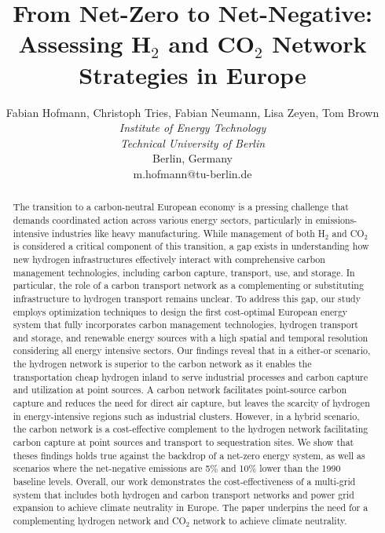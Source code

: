 \documentclass[twocolumn]{article}
\newcommand{\carbon}{CO$_2$}
\newcommand{\hydrogen}{H$_2$}
\begin{document}


\title{From Net-Zero to Net-Negative: Assessing \hydrogen{} and \carbon{} Network Strategies in Europe}

\author{
    Fabian Hofmann, Christoph Tries, Fabian Neumann, Lisa Zeyen, Tom Brown \\
    \textit{Institute of Energy Technology} \\
    \textit{Technical University of Berlin}\\
    Berlin, Germany \\
    m.hofmann@tu-berlin.de
}


\maketitle

\begin{abstract}
    The transition to a carbon-neutral European economy is a pressing challenge that demands coordinated action across various energy sectors, particularly in emissions-intensive industries like heavy manufacturing. While management of both \hydrogen{} and \carbon{} is considered a critical component of this transition, a gap exists in understanding how new hydrogen infrastructures effectively interact with comprehensive carbon management technologies, including carbon capture, transport, use, and storage. In particular, the role of a carbon transport network as a complementing or substituting infrastructure to hydrogen transport remains unclear. To address this gap, our study employs optimization techniques to design the first cost-optimal European energy system that fully incorporates carbon management technologies, hydrogen transport and storage, and renewable energy sources with a high spatial and temporal resolution considering all energy intensive sectors.
    Our findings reveal that in a either-or scenario, the hydrogen network is superior to the carbon network as it enables the transportation cheap hydrogen inland to serve industrial processes and carbon capture and utilization at point sources. A carbon network facilitates point-source carbon capture and reduces the need for direct air capture, but leaves the scarcity of hydrogen in energy-intensive regions such as industrial clusters.
    However, in a hybrid scenario, the carbon network is a cost-effective complement to the hydrogen network facilitating carbon capture at point sources and transport to sequestration sites.
    We show that theses findings holds true against the backdrop of a net-zero energy system, as well as scenarios where the net-negative emissions are 5\% and 10\% lower than the 1990 baseline levels.
    Overall, our work demonstrates the cost-effectiveness of a multi-grid system that includes both hydrogen and carbon transport networks and power grid expansion to achieve climate neutrality in Europe.
    The paper underpins the need for a complementing hydrogen network and \carbon{} network to achieve climate neutrality.
\end{abstract}
\end{document}
